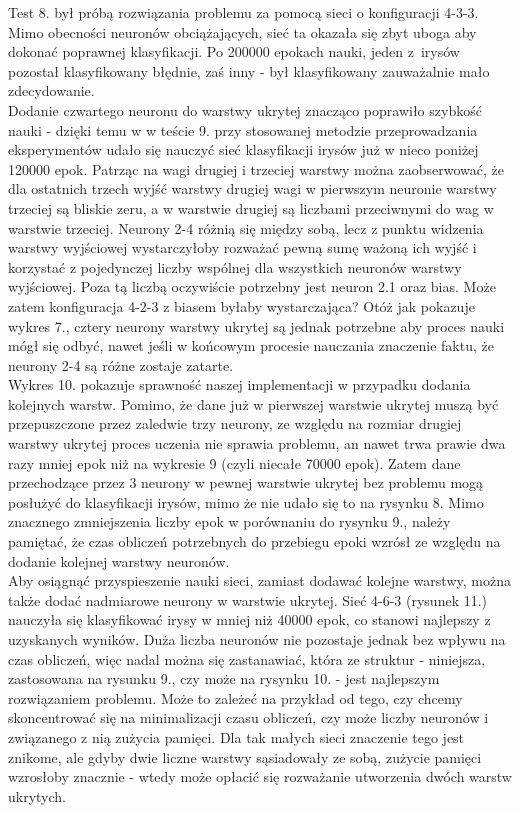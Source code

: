 \documentclass{classrep}
\begin{document}
Test 8. był próbą rozwiązania problemu za pomocą sieci o konfiguracji 4-3-3. Mimo
obecności neuronów obciążających, sieć ta okazała się zbyt uboga aby dokonać poprawnej
klasyfikacji. Po 200000 epokach nauki, jeden z~irysów pozostał klasyfikowany błędnie,
zaś inny - był klasyfikowany zauważalnie mało zdecydowanie. \\

Dodanie czwartego neuronu do warstwy ukrytej znacząco poprawiło szybkość nauki - dzięki
temu w w teście 9. przy stosowanej metodzie przeprowadzania eksperymentów udało się nauczyć sieć
klasyfikacji irysów już w nieco poniżej 120000 epok. Patrząc na wagi drugiej
i trzeciej warstwy można zaobserwować, że dla ostatnich trzech wyjść warstwy drugiej
wagi w pierwszym neuronie warstwy trzeciej są bliskie zeru, a w warstwie drugiej są liczbami
przeciwnymi do wag w warstwie trzeciej.
Neurony 2-4 różnią się między sobą, lecz z punktu widzenia warstwy wyjściowej wystarczyłoby rozważać pewną
sumę ważoną ich wyjść i korzystać z pojedynczej liczby wspólnej dla wszystkich neuronów warstwy wyjściowej.
Poza tą liczbą oczywiście potrzebny jest neuron 2.1 oraz bias. Może
zatem konfiguracja 4-2-3 z biasem byłaby wystarczająca? Otóż jak pokazuje wykres 7., cztery neurony
warstwy ukrytej są jednak potrzebne aby proces nauki mógł się odbyć, nawet jeśli
w końcowym procesie nauczania znaczenie faktu, że neurony 2-4 są różne zostaje zatarte. \\

Wykres 10. pokazuje sprawność naszej implementacji w przypadku dodania kolejnych warstw.
Pomimo, że dane już w pierwszej warstwie ukrytej muszą być przepuszczone przez zaledwie
trzy neurony, ze względu na rozmiar drugiej warstwy ukrytej proces uczenia nie sprawia
problemu, an nawet trwa prawie dwa razy mniej epok niż na wykresie 9 (czyli niecałe 70000 epok).
Zatem dane przechodzące przez 3 neurony w pewnej warstwie ukrytej bez
problemu mogą posłużyć do klasyfikacji irysów, mimo że nie udało się to na rysynku 8.
Mimo znacznego zmniejszenia liczby epok w porównaniu do rysynku 9., należy pamiętać,
że czas obliczeń potrzebnych do przebiegu epoki wzrósł ze względu na dodanie
kolejnej warstwy neuronów. \\

Aby osiągnąć przyspieszenie nauki sieci, zamiast dodawać kolejne warstwy, można także
dodać nadmiarowe neurony w warstwie ukrytej. Sieć 4-6-3 (rysunek 11.) nauczyła się
klasyfikować irysy w mniej niż 40000 epok, co stanowi najlepszy z uzyskanych wyników.
Duża liczba neuronów nie pozostaje jednak bez wpływu na czas obliczeń, więc nadal
można się zastanawiać, która ze struktur - niniejsza, zastosowana na rysunku 9., czy może na rysynku 10.
- jest najlepszym rozwiązaniem problemu. Może to zależeć na przykład od tego, czy chcemy
skoncentrować się na minimalizacji czasu obliczeń, czy może liczby neuronów i
związanego z nią zużycia pamięci. Dla tak małych sieci znaczenie tego jest znikome,
ale gdyby dwie liczne warstwy sąsiadowały ze sobą, zużycie pamięci wzrosłoby znacznie
- wtedy może opłacić się rozważanie utworzenia dwóch warstw ukrytych. \\
\end{document}
